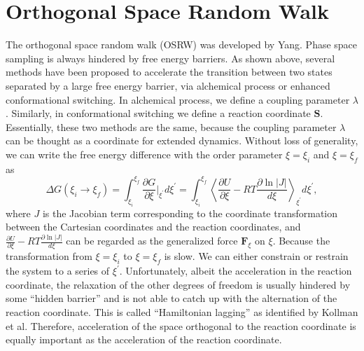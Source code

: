 \section{Orthogonal Space Random Walk\label{Sec:ES:OSRW}}
The orthogonal space random walk (OSRW) was developed by Yang.\cite{ZhengPNAS2008}
Phase space sampling is always hindered by free energy barriers. As shown above, several methods have been proposed to accelerate the transition between two states separated by a large free energy barrier, via alchemical process or enhanced conformational switching. In alchemical process, we define a coupling parameter $\lambda$. Similarly, in conformational switching we define a reaction coordinate $\mathbf{S}$. Essentially, these two methods are the same, because the coupling parameter $\lambda$ can be thought as a coordinate for extended dynamics. Without loss of generality, we can write the free energy difference with the order parameter $\xi=\xi_i$ and $\xi=\xi_f$ as
\begin{equation}
	\Delta G(\xi_i \rightarrow \xi_f)=\int_{\xi_i}^{\xi_f}\frac{\partial G}{\partial \xi}\bigg\rvert_{\xi^\prime} d\xi^\prime=\int_{\xi_i}^{\xi_f}\left<\frac{\partial U}{\partial \xi}-RT\frac{\partial \ln{|J|}}{d\xi}\right>_{\xi^\prime}d\xi^\prime,
\end{equation}
where $J$ is the Jacobian term corresponding to the coordinate transformation between the Cartesian coordinates and the reaction coordinates, and $\frac{\partial U}{\partial \xi}-RT\frac{\partial \ln{|J|}}{d\xi}$ can be regarded as the generalized force $\mathbf{F}_\xi$ on $\xi$. Because the transformation from $\xi=\xi_i$ to $\xi=\xi_f$ is slow. We can either constrain or restrain the system to a series of $\xi^\prime$. Unfortunately, albeit the acceleration in the reaction coordinate, the relaxation of the other degrees of freedom is usually hindered by some ``hidden barrier'' and is not able to catch up with the alternation of the reaction coordinate. This is called ``Hamiltonian lagging'' as identified by Kollman et al.\cite{PearlmanJCP1989} Therefore, acceleration of the space orthogonal to the reaction coordinate is equally important as the acceleration of the reaction coordinate.

